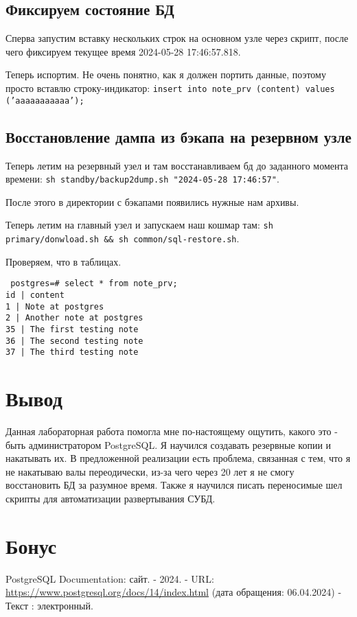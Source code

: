 \documentclass{article}
\begin{document}
\subsection{Фиксируем состояние БД}

Сперва запустим вставку нескольких строк на основном узле через скрипт, после чего фиксируем текущее время 2024-05-28 17:46:57.818.



Теперь испортим. Не очень понятно, как я должен портить данные, поэтому просто вставлю строку-индикатор: \texttt{insert into note\_prv (content) values ('aaaaaaaaaaa');
}

\subsection{Восстановление дампа из бэкапа на резервном узле}

Теперь летим на резервный узел и там восстанавливаем бд до заданного момента времени: \texttt{sh standby/backup2dump.sh "2024-05-28 17:46:57"}.

После этого в директории с бэкапами появились нужные нам архивы. 

Теперь летим на главный узел и запускаем наш кошмар там: \texttt{sh primary/donwload.sh \&\& sh common/sql-restore.sh}.

Проверяем, что в таблицах.

\texttt{
postgres=\# select * from note\_prv;\\
 id |         content          \\
  1 | Note at postgres\\
  2 | Another note at postgres\\
 35 | The first testing note\\
 36 | The second testing note\\
 37 | The third testing note
}

\section{Вывод}

Данная лабораторная работа помогла мне по-настоящему ощутить, какого это - быть администратором PostgreSQL. Я научился создавать резервные копии и накатывать их. В предложенной реализации есть проблема, связанная с тем, что я не накатываю валы переодически, из-за чего через 20 лет я не смогу восстановить БД за разумное время. Также я научился писать переносимые шел скрипты для автоматизации развертывания СУБД.

\section{Бонус}



\begin{thebibliography}{99}
    PostgreSQL Documentation: сайт. - 2024.
    - URL: \url{https://www.postgresql.org/docs/14/index.html} (дата обращения: 06.04.2024) - Текст : электронный.
\end{thebibliography}
\end{document}
